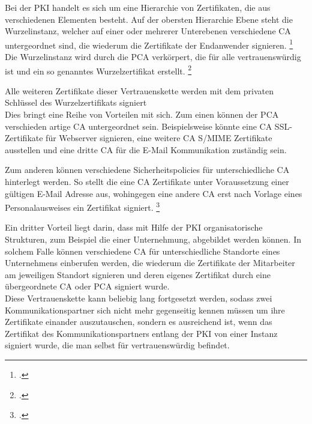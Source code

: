 \documentclass  [paper=a4,
				fontsize=12pt,
				listof=totoc,
				bibliography=totoc
				]{scrreprt}
\begin{document}
					
			Bei der \ac{PKI} handelt es sich um eine Hierarchie von Zertifikaten, die aus verschiedenen Elementen besteht. Auf der obersten Hierarchie Ebene steht die Wurzelinstanz, welcher auf einer oder mehrerer Unterebenen verschiedene \ac{CA} untergeordnet sind, die wiederum die Zertifikate der Endanwender signieren. \footcite[Vgl.][]{Schwenk, S.23}\medskip\\
			
			Die Wurzelinstanz wird durch die \ac{PCA} verkörpert, die  für alle vertrauenswürdig ist und ein so genanntes Wurzelzertifikat erstellt. \footcite[Vgl. ][]{ITWissen2012} 
			
			Alle weiteren Zertifikate dieser Vertrauenskette werden mit dem privaten Schlüssel des Wurzelzertifikats signiert %
			\medskip\\
						
			Dies bringt eine Reihe von Vorteilen mit sich. Zum einen können der \ac{PCA} verschieden artige \ac{CA} untergeordnet sein. Beispielsweise könnte eine \ac{CA} SSL-Zertifikate für Webserver signieren, eine weitere \ac{CA} S/MIME Zertifikate ausstellen und eine dritte \ac{CA} für die E-Mail Kommunikation zuständig sein.
			
			Zum anderen können verschiedene Sicherheitspolicies für unterschiedliche \ac{CA} hinterlegt werden. So stellt die eine \ac{CA} Zertifikate unter Voraussetzung einer gültigen E-Mail Adresse aus, wohingegen eine andere CA erst nach Vorlage eines Personalausweises ein Zertifikat signiert. \footcite[Vgl.][]{Schwenk, S.24}
			
			Ein dritter Vorteil liegt darin, dass mit Hilfe der \ac{PKI} organisatorische Strukturen, zum Beispiel die einer Unternehmung, abgebildet werden können. In solchem Falle können verschiedene CA für unterschiedliche Standorte eines Unternehmens einberufen werden, die wiederum die Zertifikate der Mitarbeiter am jeweiligen Standort signieren und deren eigenes Zertifikat durch eine übergeordnete \ac{CA} oder \ac{PCA} signiert wurde. \medskip\\
			
			Diese Vertrauenskette kann beliebig lang fortgesetzt werden, sodass zwei Kommunikationspartner sich nicht mehr gegenseitig kennen müssen um ihre Zertifikate einander auszutauschen, sondern es ausreichend ist, wenn das Zertifikat des Kommunikationspartners entlang der  \ac{PKI} von einer Instanz signiert wurde, die man selbst für vertrauenswürdig befindet. \medskip\\
			
\end{document}

